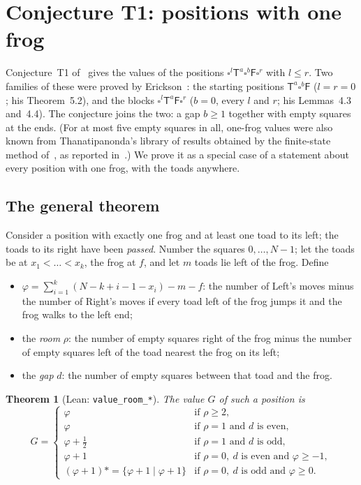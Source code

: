\documentclass[11pt,a4paper]{article}
\newcommand{\Tt}{\mathsf{T}}
\newcommand{\Ff}{\mathsf{F}}
\newcommand{\E}{\square}
\newcommand{\lean}[1]{\texttt{#1}}
\theoremstyle{plain}
\newtheorem{theorem}{Theorem}
\theoremstyle{remark}
\begin{document}
\section{Conjecture T1: positions with one frog}\label{sec:T1}

Conjecture~T1 of~\cite{T11} gives the values of the positions $\E^l\Tt^a\E^b\Ff\E^r$ with
$l\le r$. Two families of these were proved by Erickson~\cite{E96}: the starting positions
$\Tt^a\E^b\Ff$ ($l=r=0$; his Theorem~5.2), and the blocks $\E^l\Tt^a\Ff\E^r$ ($b=0$, every $l$
and $r$; his Lemmas~4.3 and~4.4). The conjecture joins the two: a gap $b\ge1$ together with empty
squares at the ends. (For at most five empty squares in all, one-frog values were also known from
Thanatipanonda's library of results obtained by the finite-state method of~\cite{TZ07}, as
reported in~\cite{T11b}.) We prove it as a special case of a statement about every position with one
frog, with the toads anywhere.

\subsection{The general theorem}

Consider a position with exactly one frog and at least one toad to its left; the toads to its
right have been \emph{passed}. Number the squares $0,\dots,N-1$; let the toads be at
$x_1<\dots<x_k$, the frog at $f$, and let $m$ toads lie left of the frog. Define
\begin{itemize}
\item $\varphi=\sum_{i=1}^{k}(N-k+i-1-x_i)-m-f$: the number of Left's moves minus the number of
  Right's moves if every toad left of the frog jumps it and the frog walks to the left end;
\item the \emph{room} $\rho$: the number of empty squares right of the frog minus the number of
  empty squares left of the toad nearest the frog on its left;
\item the \emph{gap} $d$: the number of empty squares between that toad and the frog.
\end{itemize}

\begin{theorem}[Lean: \lean{value\_room\_*}]
\label{thm:onefrog}
The value $G$ of such a position is
\[
G=\begin{cases}
\varphi & \text{if } \rho\ge2,\\
\varphi & \text{if } \rho=1 \text{ and } d \text{ is even},\\
\varphi+\tfrac12 & \text{if } \rho=1 \text{ and } d \text{ is odd},\\
\varphi+1 & \text{if } \rho=0,\ d \text{ is even and } \varphi\ge-1,\\
(\varphi+1)\ast=\{\varphi+1\mid\varphi+1\} & \text{if } \rho=0,\ d \text{ is odd and } \varphi\ge0.
\end{cases}
\]
\end{theorem}
\end{document}
